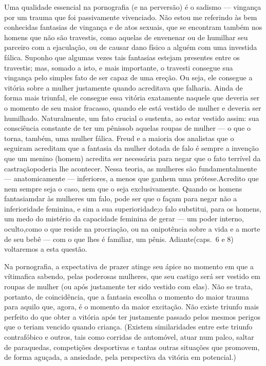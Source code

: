 Uma qualidade essencial na pornografia (e na perversão) é o\idxsadiporn{} sadismo\idxpornosadi{}
--- vingança por um trauma que foi passivamente vivenciado. Não estou
me referindo às bem conhecidas fantasias de vingança e de atos sexuais,
que se encontram também nos homens que não são travestis, como aquelas
de envenenar ou de humilhar seu parceiro com a ejaculação, ou de causar
dano físico a alguém com uma investida fálica. Suponho que algumas
vezes tais fantasias estejam presentes entre os travestis; mas, somado
a isto, e mais importante, o travesti consegue sua vingança pelo
simples fato de ser capaz de uma ereção. Ou seja, ele consegue a
vitória sobre a mulher justamente quando acreditava que falharia. Ainda
de forma mais triunfal, ele consegue essa vitória exatamente naquele
que deveria ser o momento de seu maior fracasso, quando ele está
vestido de mulher e deveria ser humilhado. Naturalmente, um fato
crucial o sustenta, ao estar vestido assim: sua consciência constante
de ter um pênis\idxpenisfant[|(] sob aquelas roupas de mulher --- o que o torna,
também, uma mulher fálica.\idxcastamulh{} Freud\idxfreudmulhe{} e a maioria dos analistas que o
seguiram acreditam que a fantasia da mulher dotada de falo é sempre a
invenção que um menino (homem) acredita ser necessária para negar que o
fato terrível da castração\idxcastatrav[|)] poderia lhe acontecer. Nessa teoria, as
mulheres são fundamentalmente --- anatomicamente --- inferiores, a
menos que ganhem uma prótese.\idxtravemangu[|)] Acredito que nem sempre seja o caso, nem
que o seja exclusivamente. Quando os homens fantasiam\idxtravemfant[|(] dar às mulheres
um falo, pode ser que o façam para negar não a inferioridade feminina,
e sim a sua superioridade;\idxtravemmasc[|(] o falo substitui, para os homens, um medo do
mistério da capacidade feminina de gerar --- um poder interno, oculto,\idxtravemving[|)]
como o que reside na procriação,\idxcondfcapa{} ou na onipotência sobre a vida e a
morte de seu bebê --- com o que lhes é familiar, um pênis. Adiante\idxvingatra[|)]
(caps.~6 e 8) voltaremos a esta questão.

Na pornografia, a expectativa de prazer atinge seu ápice no momento em que a vítima\idxpornoviti[|(] fica
sabendo, pelas poderosas mulheres, que seu castigo será ser vestido em roupas de mulher (ou após justamente ter sido vestido com elas). Não se trata, portanto, de coincidência, que a fantasia escolha o momento do
maior trauma para aquilo que, agora, é o momento da maior excitação.
Não existe triunfo mais perfeito do que obter a vitória após ter
justamente passado pelos\idxperigo{} mesmos perigos\idxpervexpos{} que o teriam vencido quando
criança. (Existem similaridades entre este triunfo contrafóbico e
outros, tais como corridas de automóvel, atuar num palco, saltar de
paraquedas, competições desportivas e tantas outras situações que
promovem, de forma aguçada, a ansiedade, pela perspectiva da vitória em
potencial.)

